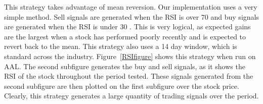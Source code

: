 \documentclass[letterpaper,11pt]{article}
\begin{document}
This strategy takes advantage of mean reversion. Our implementation uses a very simple method. Sell signals are generated when the RSI is over 70 and buy signals are generated when the RSI is under 30 \cite{Chong2014}. This is very logical, as expected gains are the largest when a stock has performed poorly recently and is expected to revert back to the mean. This strategy also uses a 14 day window, which is standard across the industry. Figure~\ref{RSIfigure} shows this strategy when run on AAL. The second subfigure generates the buy and sell signals, as it shows the RSI of the stock throughout the period tested. These signals generated from the second subfigure are then plotted on the first subfigure over the stock price. Clearly, this strategy generates a large quantity of trading signals over the period.

\begin{figure}[h]
\centering


\end{figure}
\end{document}
